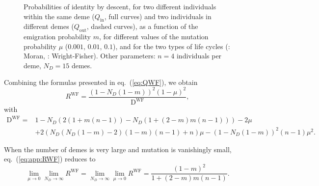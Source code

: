 \documentclass[11pt, letterpaper]{article}
\renewcommand{\eqref}[1]{\textup{{\normalfont eq.~(\ref{#1}}\normalfont)}}
\newcommand{\WF}{\textrm{WF}}
\newcommand{\inn}{\textrm{in}}
\newcommand{\out}{\textrm{out}}
\newcommand{\Qin}{Q_{\inn}}
\newcommand{\Qout}{Q_{\out}}
\newcommand{\ndemes}{N_D}
\begin{document}
\begin{figure}[h]
\begin{tabular}{cc}
\end{tabular}
\caption{Probabilities of identity by descent, for two different individuals within the same deme ($\Qin$, full curves) and two individuals in different demes ($\Qout$, dashed curves), as a function of the emigration probability $m$, for different values of the mutation probability $\mu$ ($0.001$, $0.01$, $0.1$), and for the two types of life cycles (: Moran, : Wright-Fisher). Other parameters: $n=4$ individuals per deme, $\ndemes = 15$ demes. }
\label{fig:Q}
\end{figure}

Combining the formulas presented in \eqref{eq:QWF}, we obtain
\begin{equation}\label{eq:app:RWF}
R^{\WF} = \frac{(1 - \ndemes (1-m))^2 (1-\mu)^2}{\mathrm{D}^{\WF} },
\end{equation}
with
\begin{equation*}
\begin{split}
\mathrm{D}^{\WF} = & 1-\ndemes (2 (1+m (n-1))-\ndemes (1+(2-m) m (n-1)))-2 \mu \\ &+ 2 (\ndemes (\ndemes (1-m)-2) (1-m) (n-1) + n) \mu - (1-\ndemes (1-m))^2 (n-1) \mu^2.
\end{split}
\end{equation*}

When the number of demes is very large and mutation is vanishingly small, \eqref{eq:app:RWF} reduces to 
%
\begin{equation}\label{eq:app:RWFlim}
\lim_{\mu \to 0} \lim_{\ndemes \to \infty} R^{\WF} = \lim_{\ndemes \to \infty} \lim_{\mu \to 0}  R^{\WF} =  \frac{(1 - m)^2}{1 + (2 - m) m (n - 1)}.
\end{equation}
\end{document}
